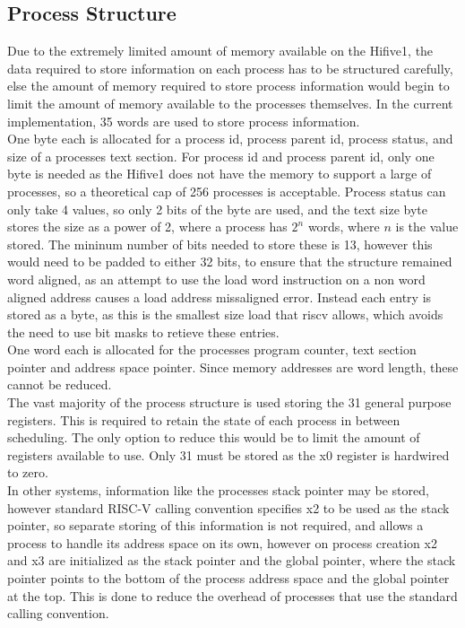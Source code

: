 \subsection{Process Structure}
Due to the extremely limited amount of memory available on the Hifive1, the data required to store information on each process has to be structured carefully, else the amount of memory required to store process information would begin to limit the amount of memory available to the processes themselves. In the current implementation, 35 words are used to store process information.
\\
One byte each is allocated for a process id, process parent id, process status, and size of a processes text section. For process id and process parent id, only one byte is needed as the Hifive1 does not have the memory to support a large of processes, so a theoretical cap of 256 processes is acceptable. Process status can only take 4 values, so only 2 bits of the byte are used, and the text size byte stores the size as a power of 2, where a process has \(2^n\) words, where \(n\) is the value stored. The mininum number of bits needed to store these is 13, however this would need to be padded to either 32 bits, to ensure that the structure remained word aligned, as an attempt to use the load word instruction on a non word aligned address causes a load address missaligned error. Instead each entry is stored as a byte, as this is the smallest size load that \gls{riscv} allows, which avoids the need to use bit masks to retieve these entries.
\\
One word each is allocated for the processes program counter, text section pointer and address space pointer. Since memory addresses are word length, these cannot be reduced.
\\
The vast majority of the process structure is used storing the 31 general purpose registers. This is required to retain the state of each process in between scheduling. The only option to reduce this would be to limit the amount of registers available to use. Only 31 must be stored as the x0 register is hardwired to zero.
\\
In other systems, information like the processes stack pointer may be stored, however standard RISC-V calling convention specifies x2 to be used as the stack pointer, so separate storing of this information is not required, and allows a process to handle its address space on its own, however on process creation x2 and x3 are initialized as the stack pointer and the global pointer, where the stack pointer points to the bottom of the process address space and the global pointer at the top. This is done to reduce the overhead of processes that use the standard calling convention.
